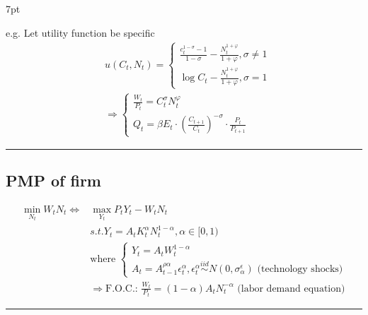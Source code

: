 \documentclass{article}
\newcommand*\sepline{%
  \begin{center}
    \rule[1ex]{.5\textwidth}{.5pt}
  \end{center}}
\newenvironment{greenblock}{%
\def\FrameCommand{%
  \hspace{1pt}%
    {\color{Green}%
    \vrule width 2pt}%
    {\color{greenshade}%
    \vrule width 4pt}%
  \colorbox{greenshade}%
}%
\MakeFramed{%
  \advance%
  \hsize-%
  \width%
  \FrameRestore}%
\noindent\hspace{-4.55pt}%
\begin{adjustwidth}{}{7pt}%
\vspace{2pt}\vspace{2pt}%
}
{%
\vspace{2pt}\end{adjustwidth}\endMakeFramed%
}
\begin{document}
\begin{greenblock}
e.g. Let utility function be specific
\begin{align}
&
u(C_{t},N_{t})=\begin{cases}
\frac{c^{1-\sigma}_{t}-1}{1-\sigma}-\frac{N_{t}^{1+\varphi}}{1+\varphi},\sigma\neq 1 \\
\log C_{t}-\frac{N_{t}^{1+\varphi}}{1+\varphi},\sigma=1\end{cases}
\\&
\Rightarrow \begin{cases}
\frac{W_{t}}{P_{t}}=C_{t}^{\sigma}N_{t}^{\varphi} \\
Q_{t}=\beta E_{t}\cdot (\frac{C_{t+1}}{C_{t}})^{-\sigma}\cdot \frac{P_{t}}{P_{t+1}}
\end{cases}
\end{align}
\end{greenblock}



\sepline
\subsection{PMP of firm}
\begin{align}
\min\limits_{N_{t}} W_t N_t \Leftrightarrow &\max\limits_{Y_t} P_{t}Y_{t}-W_{t}N_{t}
\\&s.t. Y_t = A_t K_t^\alpha N_t^{1-\alpha}, \alpha \in [0,1)
\\&
\text{where } 
\begin{cases}
  Y_{t}=A_{t}W_{t}^{1-\alpha}\\
  A_{t}=A_{t-1}^{\rho\alpha} \epsilon_{t}^{\alpha}, \epsilon_{t}^{\alpha} \overset{iid}{\sim} N(0,\sigma_{\alpha}^{\epsilon})
  \text{ (technology shocks)}
\end{cases}
\\&
\Rightarrow \text{F.O.C.: } \frac{W_{t}}{P_{t}}=(1-\alpha)A_{t}N_{t}^{-\alpha} \text{ (labor demand equation)}
\end{align}

\sepline
\end{document}

